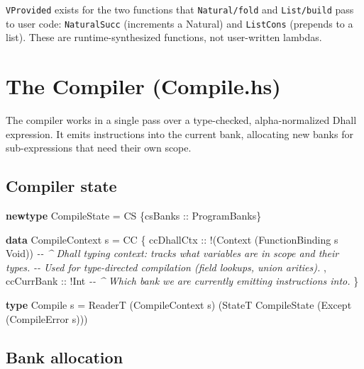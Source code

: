 \documentclass[]{article}
\newenvironment{Shaded}{}{}
\newcommand{\CommentTok}[1]{\textcolor[rgb]{0.38,0.63,0.69}{\textit{#1}}}
\newcommand{\DataTypeTok}[1]{\textcolor[rgb]{0.56,0.13,0.00}{#1}}
\newcommand{\KeywordTok}[1]{\textcolor[rgb]{0.00,0.44,0.13}{\textbf{#1}}}
\newcommand{\NormalTok}[1]{#1}
\newcommand{\OperatorTok}[1]{\textcolor[rgb]{0.40,0.40,0.40}{#1}}
\newcommand{\OtherTok}[1]{\textcolor[rgb]{0.00,0.44,0.13}{#1}}
\begin{document}
\texttt{VProvided} exists for the two functions that \texttt{Natural/fold} and
\texttt{List/build} pass to user code: \texttt{NaturalSucc} (increments a
Natural) and \texttt{ListCons} (prepends to a list). These are
runtime-synthesized functions, not user-written lambdas.

\section{The Compiler (Compile.hs)}\label{the-compiler-compile.hs}

The compiler works in a single pass over a type-checked, alpha-normalized Dhall
expression. It emits instructions into the current bank, allocating new banks
for sub-expressions that need their own scope.

\subsection{Compiler state}\label{compiler-state}

\begin{Shaded}
\begin{Highlighting}[]
\KeywordTok{newtype} \DataTypeTok{CompileState} \OtherTok{=} \DataTypeTok{CS}\NormalTok{ \{}\OtherTok{csBanks ::} \DataTypeTok{ProgramBanks}\NormalTok{\}}

\KeywordTok{data} \DataTypeTok{CompileContext}\NormalTok{ s }\OtherTok{=} \DataTypeTok{CC}
\NormalTok{    \{}\OtherTok{ ccDhallCtx ::} \OperatorTok{!}\NormalTok{(}\DataTypeTok{Context}\NormalTok{ (}\DataTypeTok{FunctionBinding}\NormalTok{ s }\DataTypeTok{Void}\NormalTok{))}
    \CommentTok{{-}{-} \^{} Dhall typing context: tracks what variables are in scope and their types.}
    \CommentTok{{-}{-}   Used for type{-}directed compilation (field lookups, union arities).}
\NormalTok{    ,}\OtherTok{ ccCurrBank ::} \OperatorTok{!}\DataTypeTok{Int}
    \CommentTok{{-}{-} \^{} Which bank we are currently emitting instructions into.}
\NormalTok{    \}}

\KeywordTok{type} \DataTypeTok{Compile}\NormalTok{ s }\OtherTok{=} \DataTypeTok{ReaderT}\NormalTok{ (}\DataTypeTok{CompileContext}\NormalTok{ s) (}\DataTypeTok{StateT} \DataTypeTok{CompileState}\NormalTok{ (}\DataTypeTok{Except}\NormalTok{ (}\DataTypeTok{CompileError}\NormalTok{ s)))}
\end{Highlighting}
\end{Shaded}

\subsection{Bank allocation}\label{bank-allocation}
\end{document}
